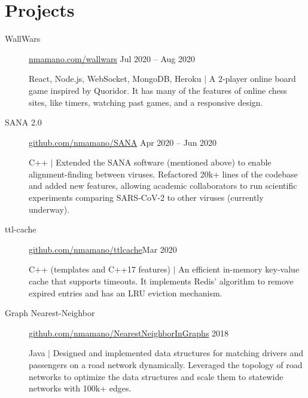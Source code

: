 \documentclass[letterpaper,10pt,oneside]{article}
\begin{document}
\section*{Projects}
\begin{description}
	\item[WallWars]\quad \href{http://nmamano.com/wallwars/index.html}{nmamano.com/wallwars} \hfill Jul 2020 -- Aug 2020
	
	React, Node.js, WebSocket, MongoDB, Heroku $|$ A 2-player online board game inspired by Quoridor. It has many of the features of online chess sites, like timers, watching past games, and a responsive design.
	 
	\item[SANA 2.0]\quad  \href{https://github.com/nmamano/SANA}{github.com/nmamano/SANA} \hfill Apr 2020 -- Jun 2020
	
	C++ $|$ Extended the SANA software (mentioned above) to enable alignment-finding between viruses. Refactored 20k+ lines of the codebase and added new features, allowing academic collaborators to run scientific experiments comparing SARS-CoV-2 to other viruses (currently underway).

	\item[ttl-cache]\quad  \href{https://github.com/nmamano/ttlcache}{github.com/nmamano/ttlcache}\hfill  Mar 2020
	
	C++ (templates and C++17 features) $|$ An efficient in-memory key-value cache that supports timeouts. It implements Redis' algorithm to remove expired entries and has an LRU eviction mechanism.
	
	\item[Graph Nearest-Neighbor]\quad  \href{https://github.com/nmamano/NearestNeighborInGraphs}{github.com/nmamano/NearestNeighborInGraphs} \hfill 2018
	 
	 Java $|$ Designed and implemented data structures for matching drivers and passengers on a road network dynamically. Leveraged the topology of road networks to optimize the data structures and scale them to statewide networks with 100k+ edges.  
		 \begin{comment}
	\item[Stable Matching Voronoi Diagram]\quad  \href{https://github.com/nmamano/StableMatchingVoronoiDiagram}{github.com/nmamano/StableMatchingVoronoiDiagram} \hfill 2018
	
	C++, OpenGL, Javascript $|$ Designed and implemented clustering algorithms for partitioning data into balanced clusters, and researched their application to gerrymandering prevention: they can partition a geographic region into compact and equal-population districts. Built a desktop application to visualize and benchmark the algorithms.
	\item[Chespel]\quad  \href{https://github.com/nmamano/Chespel}{github.com/nmamano/Chespel}\hfill 2014
	

\end{comment}
\end{description}
\end{document}
